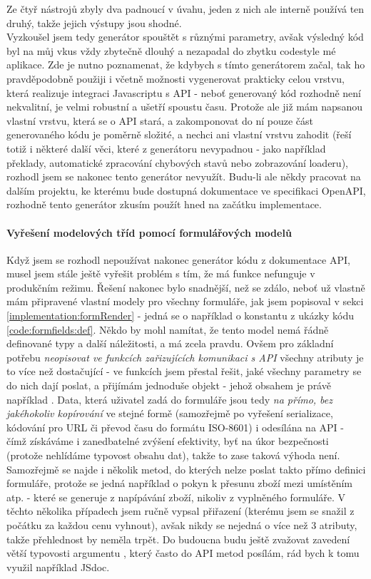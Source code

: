 Ze čtyř nástrojů zbyly dva padnoucí v úvahu, jeden z nich ale interně používá ten druhý, takže jejich výstupy jsou shodné.\\
Vyzkoušel jsem tedy generátor spouštět s různými parametry, avšak výsledný kód byl na můj vkus vždy zbytečně dlouhý a nezapadal do zbytku codestyle mé aplikace. Zde je nutno poznamenat, že kdybych s tímto generátorem začal, tak ho pravděpodobně použiji i včetně možnosti vygenerovat prakticky celou vrstvu, která realizuje integraci Javascriptu s API - neboť generovaný kód rozhodně není nekvalitní, je velmi robustní a ušetří spoustu času. Protože ale již mám napsanou vlastní vrstvu, která se o API stará, a zakomponovat do ní pouze část generovaného kódu je poměrně složité, a nechci ani vlastní vrstvu zahodit (řeší totiž i některé další věci, které z generátoru nevypadnou - jako například překlady, automatické zpracování chybových stavů nebo zobrazování loaderu), rozhodl jsem se nakonec tento generátor nevyužít. Budu-li ale někdy pracovat na dalším projektu, ke kterému bude dostupná dokumentace ve specifikaci OpenAPI, rozhodně tento generátor zkusím použít hned na začátku implementace.

\paragraph{Vyřešení modelových tříd pomocí formulářových modelů} Když jsem se rozhodl nepoužívat nakonec generátor kódu z dokumentace API, musel jsem stále ještě vyřešit problém s tím, že má funkce  nefunguje v produkčním režimu. Řešení nakonec bylo snadnější, než se zdálo, neboť už vlastně mám připravené vlastní modely pro všechny formuláře, jak jsem popisoval v sekci \ref{implementation:formRender} - jedná se o například o konstantu  z ukázky kódu \ref{code:formfields:def}. Někdo by mohl namítat, že tento model nemá řádně definované typy a další náležitosti, a má zcela pravdu. Ovšem pro základní potřebu \emph{neopisovat ve funkcích zařizujících komunikaci s API} všechny atributy je to více než dostačující - ve funkcích jsem přestal řešit, jaké všechny parametry se do nich dají poslat, a přijímám jednoduše objekt  - jehož obsahem je právě například . Data, která uživatel zadá do formuláře jsou tedy \emph{na přímo, bez jakéhokoliv kopírování} ve stejné formě (samozřejmě po vyřešení serializace, kódování pro URL či převod času do formátu ISO-8601) i odesílána na API - čímž získáváme i zanedbatelné zvýšení efektivity, byť na úkor bezpečnosti (protože nehlídáme typovost obsahu dat), takže to zase taková výhoda není.\\
Samozřejmě se najde i několik metod, do kterých nelze poslat takto přímo definici formuláře, protože se jedná například o pokyn k přesunu zboží mezi umístěním atp. - které se generuje z napípávání zboží, nikoliv z vyplněného formuláře. V těchto několika případech jsem ručně vypsal přiřazení (kterému jsem se snažil z počátku za každou cenu vyhnout), avšak nikdy se nejedná o více než 3 atributy, takže přehlednost by neměla trpět.
Do budoucna budu ještě zvažovat zavedení větší typovosti argumentu , který často do API metod posílám, rád bych k tomu využil například JSdoc.


